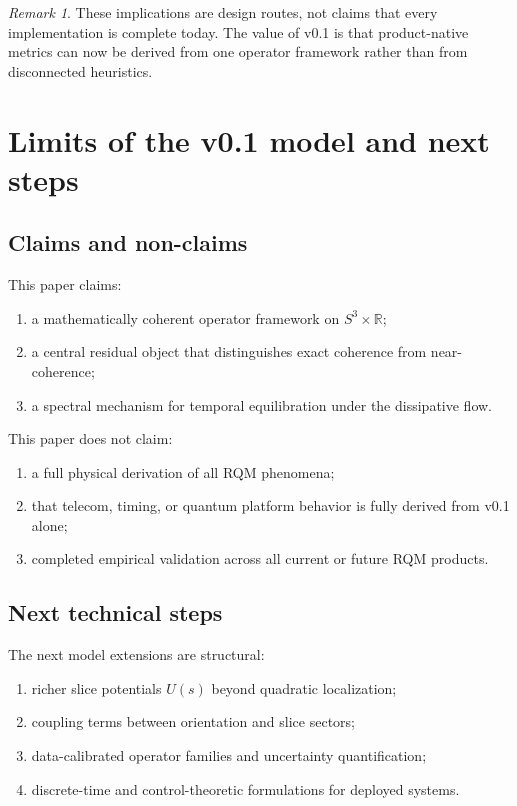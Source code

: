 \documentclass[11pt]{article}
\theoremstyle{remark}
\newtheorem{remark}[definition]{Remark}
\newcommand{\R}{\mathbb{R}}
\begin{document}
\begin{remark}
These implications are design routes, not claims that every implementation is complete today. The value of v0.1 is that product-native metrics can now be derived from one operator framework rather than from disconnected heuristics.
\end{remark}

\section{Limits of the v0.1 model and next steps}

\subsection{Claims and non-claims}

This paper claims:
\begin{enumerate}
\item a mathematically coherent operator framework on $S^3\times\R$;
\item a central residual object that distinguishes exact coherence from near-coherence;
\item a spectral mechanism for temporal equilibration under the dissipative flow.
\end{enumerate}

This paper does not claim:
\begin{enumerate}
\item a full physical derivation of all RQM phenomena;
\item that telecom, timing, or quantum platform behavior is fully derived from v0.1 alone;
\item completed empirical validation across all current or future RQM products.
\end{enumerate}

\subsection{Next technical steps}

The next model extensions are structural:
\begin{enumerate}
\item richer slice potentials $U(s)$ beyond quadratic localization;
\item coupling terms between orientation and slice sectors;
\item data-calibrated operator families and uncertainty quantification;
\item discrete-time and control-theoretic formulations for deployed systems.
\end{enumerate}
\end{document}
